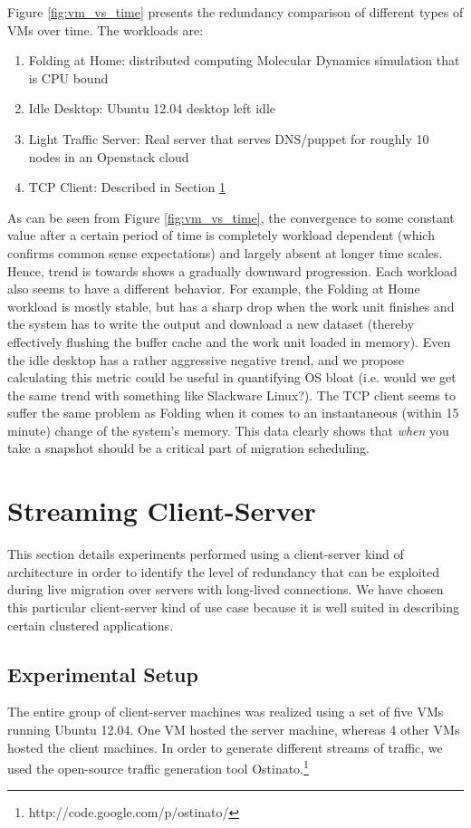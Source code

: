 \documentclass{acm_proc_article-sp}
\begin{document}
Figure \ref{fig:vm_vs_time} presents the redundancy comparison of different types of VMs over time.  The workloads are:
\begin{enumerate}
  \item Folding at Home: distributed computing Molecular Dynamics simulation that is CPU bound
  \item Idle Desktop: Ubuntu 12.04 desktop left idle
  \item Light Traffic Server: Real server that serves DNS/puppet for roughly 10 nodes in an Openstack cloud
  \item TCP Client: Described in Section \ref{sec:client-server}
\end{enumerate}

As can be seen from Figure \ref{fig:vm_vs_time}, the convergence to some constant value after a certain period of time is completely workload dependent (which confirms common sense expectations) and largely absent at longer time scales.  Hence, trend is towards shows a gradually downward progression. Each workload also seems to have a different behavior.  For example, the Folding at Home workload is mostly stable, but has a sharp drop when the work unit finishes and the system has to write the output and download a new dataset (thereby effectively flushing the buffer cache and the work unit loaded in memory).  Even the idle desktop has a rather aggressive negative trend, and we propose calculating this metric could be useful in quantifying OS bloat (i.e. would we get the same trend with something like Slackware Linux?).  The TCP client seems to suffer the same problem as Folding when it comes to an instantaneous (within 15 minute) change of the system's memory.  This data clearly shows that \textit{when} you take a snapshot should be a critical part of migration scheduling.

\section{Streaming Client-Server}\label{sec:client-server}
This section details experiments performed using a client-server kind of architecture in order to identify the level of redundancy that can be exploited during live migration over servers with long-lived connections. We have chosen this particular client-server kind of use case because it is well suited in describing certain clustered applications.

\subsection{Experimental Setup}
The entire group of client-server machines was realized using a set of five VMs running Ubuntu 12.04. One VM hosted the server machine, whereas 4 other VMs hosted the client machines. In order to generate different streams of traffic, we used the open-source traffic generation tool Ostinato.\footnote{http://code.google.com/p/ostinato/}
\end{document}
